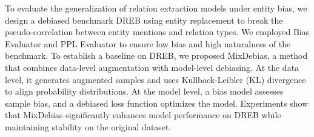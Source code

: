 \documentclass[letterpaper]{article} %
\begin{document}

To evaluate the generalization of relation extraction models under entity bias, we design a debiased benchmark DREB using entity replacement to break the pseudo-correlation between entity mentions and relation types. We employed Bias Evaluator and PPL Evaluator to ensure low bias and high naturalness of the benchmark. To establish a baseline on DREB, we proposed MixDebias, a method that combines data-level augmentation with model-level debiasing. At the data level, it generates augmented samples and uses Kullback-Leibler (KL) divergence \cite{belov2011distributions} to align probability distributions. At the model level, a bias model assesses sample bias, and a debiased loss function optimizes the model. Experiments show that MixDebias significantly enhances model performance on DREB while maintaining stability on the original dataset.
\end{document}
